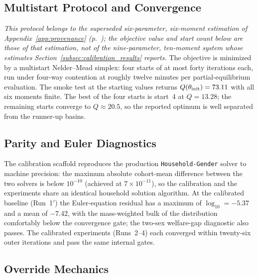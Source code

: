 \documentclass[12pt,a4paper]{article}
\begin{document}
\begin{appendices}
\subsection{Multistart Protocol and Convergence}
\label{app:multistart}

\emph{This protocol belongs to the superseded six-parameter, six-moment estimation of Appendix~\ref{app:provenance} (p.~\pageref{par:superseded}); the objective value and start count below are those of that estimation, not of the nine-parameter, ten-moment system whose estimates Section~\ref{subsec:calibration_results} reports.} The objective is minimized by a multistart Nelder--Mead simplex: four starts of at most forty iterations each, run under four-way contention at roughly twelve minutes per partial-equilibrium evaluation. The smoke test at the starting values returns $Q(\theta_{\rm init})=73.11$ with all six moments finite. The best of the four starts is start~4 at $Q=13.28$; the remaining starts converge to $Q\approx 20.5$, so the reported optimum is well separated from the runner-up basins.

\subsection{Parity and Euler Diagnostics}
\label{app:parity_euler}

The calibration scaffold reproduces the production \texttt{Household-Gender} solver to machine precision: the maximum absolute cohort-mean difference between the two solvers is below $10^{-10}$ (achieved at $7\times10^{-11}$), so the calibration and the experiments share an identical household solution algorithm. At the calibrated baseline (Run~1$'$) the Euler-equation residual has a maximum of $\log_{10}=-5.37$ and a mean of $-7.42$, with the mass-weighted bulk of the distribution comfortably below the convergence gate; the two-sex welfare-gap diagnostic also passes. The calibrated experiments (Runs~2--4) each converged within twenty-six outer iterations and pass the same internal gates.

\subsection{Override Mechanics}
\label{app:overrides}


\end{appendices}
\end{document}
